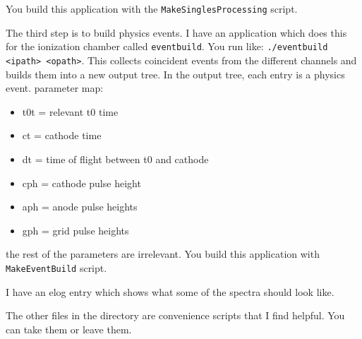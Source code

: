 \documentclass[10pt]{article}
\begin{document}
You build this application with the \verb#MakeSinglesProcessing# script.

The third step is to build physics events. I have an application which does this for the ionization chamber called \verb#eventbuild#. You run like: \verb#./eventbuild <ipath> <opath>#. This collects coincident events from the different channels and builds them into a new output tree. In the output tree, each entry is a physics event. parameter map:

\begin{itemize}
\item t0t = relevant t0 time
\item ct = cathode time
\item dt = time of flight between t0 and cathode
\item cph = cathode pulse height
\item aph = anode pulse heights
\item gph = grid pulse heights
\end{itemize}

the rest of the parameters are irrelevant. You build this application with \verb#MakeEventBuild# script.

I have an elog entry which shows what some of the spectra should look like.


The other files in the directory are convenience scripts that I find helpful. You can take them or leave them.
\end{document}
